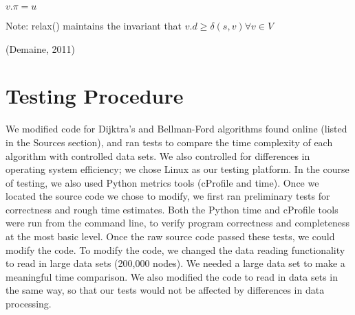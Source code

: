 \documentclass{article}
\begin{document}
\hspace{5 pt}\hspace{5 pt}\hspace{5 pt}\hspace{5 pt}\hspace{5 pt}\hspace{5 pt}$v.\pi = u$

Note: relax() maintains the invariant that $v.d \geq \delta(s,v) \forall v \in V$

(Demaine, 2011)
\section{Testing Procedure}
We modified code for Dijktra's and Bellman-Ford algorithms found online (listed in the Sources section), and ran tests to compare the time complexity of each algorithm with controlled data sets.  We also controlled for differences in operating system efficiency; we chose Linux as our testing platform.  In the course of testing, we also used Python metrics tools (cProfile and time).  Once we located the source code we chose to modify, we first ran preliminary tests for correctness and rough time estimates.  Both the Python time and cProfile tools were run from the command line, to verify program correctness and completeness at the most basic level.  Once the raw source code passed these tests, we could modify the code.
To modify the code, we changed the data reading functionality to read in large data sets (200,000 nodes).  We needed a large data set to make a meaningful time comparison.
 We also modified the code to read in data sets in the same way, so that our tests would not be affected by differences in data processing.
 
\pagebreak
\end{document}
